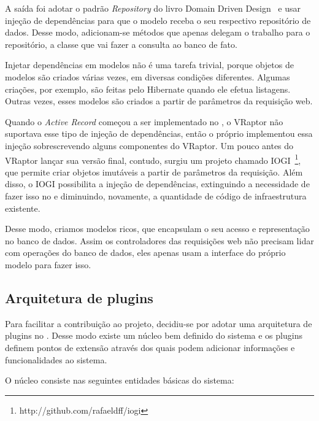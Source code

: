 A saída foi adotar o padrão \textit{Repository} do livro Domain Driven Design~\cite{ddd} e usar injeção de dependências para que o modelo receba o seu respectivo repositório de dados. Desse modo, adicionam-se métodos que apenas delegam o trabalho para o repositório, a classe que vai fazer a consulta ao banco de fato.

Injetar dependências em modelos não é uma tarefa trivial, porque objetos de modelos são criados várias vezes, em diversas condições diferentes. Algumas criações, por exemplo, são feitas pelo Hibernate quando ele efetua listagens. Outras vezes, esses modelos são criados a partir de parâmetros da requisição web.

Quando o \textit{Active Record} começou a ser implementado no \calopsita{}, o VRaptor não suportava esse tipo de injeção de dependências, então o próprio \calopsita{} implementou essa injeção sobrescrevendo alguns componentes do VRaptor. Um pouco antes do VRaptor lançar sua versão final, contudo, surgiu um projeto \opensource{} chamado IOGI~\footnote{http://github.com/rafaeldff/iogi}, que permite criar objetos imutáveis a partir de parâmetros da requisição. Além disso, o IOGI possibilita a injeção de dependências, extinguindo a necessidade de fazer isso no \calopsita{} e diminuindo, novamente, a quantidade de código de infraestrutura existente.

Desse modo, criamos modelos ricos, que encapsulam o seu acesso e representação no banco de dados. Assim os controladores das requisições web não precisam lidar com operações do banco de dados, eles apenas usam a interface do próprio modelo para fazer isso.

\subsection{Arquitetura de plugins}

Para facilitar a contribuição ao projeto, decidiu-se por adotar uma arquitetura de plugins no \calopsita{}. Desse modo existe um núcleo bem definido do sistema e os plugins definem pontos de extensão através dos quais podem adicionar informações e funcionalidades ao sistema.

O núcleo consiste nas seguintes entidades básicas do sistema:

